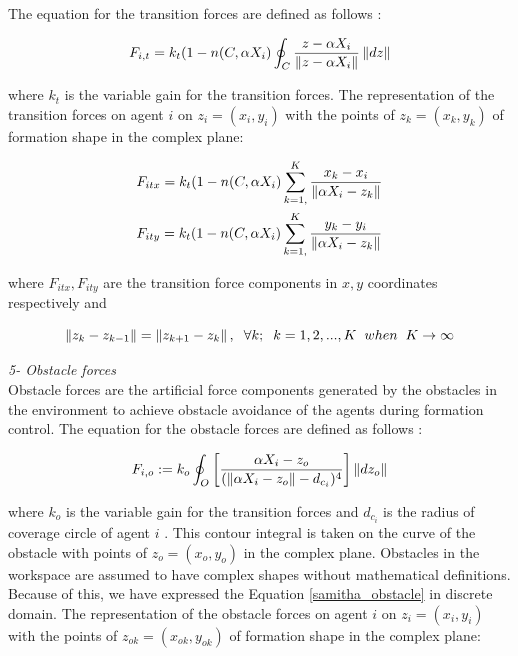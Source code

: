 The equation for the transition forces are defined as follows \cite{17}:	
				
\begin{equation}
F_{i,t} = k_t (1-n(C,\alpha X_i) \oint_C \frac{z-\alpha X_i}{\left\lVert z-\alpha X_i\right\rVert}\left\lVert dz\right\rVert
\end{equation}
				
where $k_t$ is the variable gain for the transition forces. The representation of the transition forces on agent $i$ on $z_i = (x_i, y_i)$ with the points of  $z_k = (x_k,y_k)$ of formation shape in the complex plane:
			
\begin{align}
\begin{split}
&F_{itx} = k_t  (1-n(C,\alpha X_i) \sum_{k=1,}^{K}\frac{x_k- x_i}{\left\lVert\alpha X_i - z_k\right\rVert}\\
&F_{ity} = k_t  (1-n(C,\alpha X_i) \sum_{k=1,}^{K}\frac{y_k- y_i}{\left\lVert\alpha X_i - z_k\right\rVert}\\
\end{split}
\end{align}
			
where  $F_{itx} , F_{ity} $ are the transition force components in $x,y$ coordinates respectively and

\begin{equation}
\left\lVert z_k - z_{k-1}\right\rVert = \left\lVert z_{k+1} - z_k\right\rVert, \hspace{0.2cm}  \forall k ;  \hspace{0.2cm} k=1,2,...,K \hspace{0.2cm} when  \hspace{0.2cm} K \to\infty
\end{equation}					
			
\textit{			5- Obstacle forces} \\ 
Obstacle forces are the artificial force components generated by the obstacles in the environment to achieve obstacle avoidance of the agents during formation control. 	
The equation for the obstacle forces are defined as follows \cite{17}:	
			
\begin{equation} \label{samitha_obstacle}
F_{i,o} := k_o  \oint_O \left[\frac{\alpha X_i - z_o}{(\left\lVert\alpha X_i - z_o\right\rVert - d_{c_i})^4}\right] \left\lVert dz_o\right\rVert
\end{equation}
			
where $k_o$ is the variable gain for the transition forces and $d_{c_i}$ is the radius of coverage circle of agent $i$ . This contour integral is taken on the curve of the obstacle with  points of $z_o = (x_o,y_o)$ in the complex plane. Obstacles in the workspace are assumed to have complex shapes without mathematical definitions. Because of this, we have expressed the Equation \ref{samitha_obstacle} in discrete domain. The representation of the obstacle forces on agent $i$ on $z_i = (x_i, y_i)$ with the points of  $z_{ok} = (x_{ok},y_{ok})$ of formation shape in the complex plane:
			
